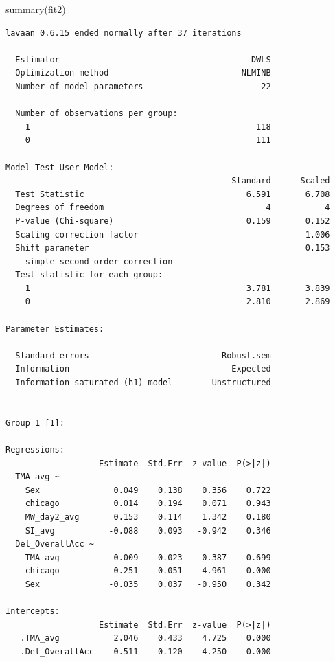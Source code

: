 \documentclass[
  letterpaper,
  DIV=11,
  numbers=noendperiod]{scrartcl}
\newenvironment{Shaded}{\begin{snugshade}}{\end{snugshade}}
\newcommand{\FunctionTok}[1]{\textcolor[rgb]{0.28,0.35,0.67}{#1}}
\newcommand{\NormalTok}[1]{\textcolor[rgb]{0.00,0.23,0.31}{#1}}
\begin{document}
\begin{Shaded}
\begin{Highlighting}[]
\FunctionTok{summary}\NormalTok{(fit2)}
\end{Highlighting}
\end{Shaded}

\begin{verbatim}
lavaan 0.6.15 ended normally after 37 iterations

  Estimator                                       DWLS
  Optimization method                           NLMINB
  Number of model parameters                        22

  Number of observations per group:                   
    1                                              118
    0                                              111

Model Test User Model:
                                              Standard      Scaled
  Test Statistic                                 6.591       6.708
  Degrees of freedom                                 4           4
  P-value (Chi-square)                           0.159       0.152
  Scaling correction factor                                  1.006
  Shift parameter                                            0.153
    simple second-order correction                                
  Test statistic for each group:
    1                                            3.781       3.839
    0                                            2.810       2.869

Parameter Estimates:

  Standard errors                           Robust.sem
  Information                                 Expected
  Information saturated (h1) model        Unstructured


Group 1 [1]:

Regressions:
                   Estimate  Std.Err  z-value  P(>|z|)
  TMA_avg ~                                           
    Sex               0.049    0.138    0.356    0.722
    chicago           0.014    0.194    0.071    0.943
    MW_day2_avg       0.153    0.114    1.342    0.180
    SI_avg           -0.088    0.093   -0.942    0.346
  Del_OverallAcc ~                                    
    TMA_avg           0.009    0.023    0.387    0.699
    chicago          -0.251    0.051   -4.961    0.000
    Sex              -0.035    0.037   -0.950    0.342

Intercepts:
                   Estimate  Std.Err  z-value  P(>|z|)
   .TMA_avg           2.046    0.433    4.725    0.000
   .Del_OverallAcc    0.511    0.120    4.250    0.000


\end{verbatim}
\end{document}
